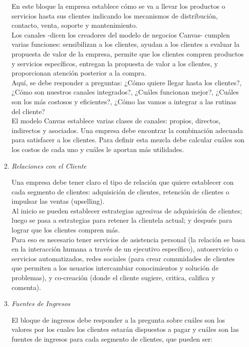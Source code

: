 \documentclass[10pt,a4paper]{article}
\begin{document}
\begin{multicols}{2}
\begin{enumerate}[1.]
			En este bloque la empresa establece cómo se va a llevar los productos o servicios hasta sus clientes indicando los mecanismos de distribución, contacto, venta, soporte y mantenimiento.\\
						
			Los canales -dicen los creadores del modelo de negocios Canvas- cumplen varias funciones: sensibilizan a los clientes, ayudan a los clientes a evaluar la propuesta de valor de la empresa, permite que los clientes compren productos y servicios específicos, entregan la propuesta de valor a los clientes, y proporcionan atención posterior a la compra.\\
			
			Aquí, se debe responder a preguntas: ¿Cómo quiere llegar hasta los clientes?, ¿Cómo son nuestros canales integrados?, ¿Cuáles funcionan mejor?, ¿Cuáles son los más costosos y eficientes?, ¿Cómo las vamos a integrar a las rutinas del cliente?\\
			
			El modelo Canvas establece varias clases de canales: propios, directos, indirectos y asociados. Una empresa debe encontrar la combinación adecuada para satisfacer a los clientes. Para definir esta mezcla debe calcular cuáles son los costos de cada uno y cuáles le aportan más utilidades.
			
			\item \textit{Relaciones con el Cliente}
			
			Una empresa debe tener claro el tipo de relación que quiere establecer con cada segmento de clientes: adquisición de clientes, retención de clientes o impulsar las ventas (upselling).\\
			
			Al inicio se pueden establecer estrategias agresivas de adquisición de clientes; luego se pasa a estrategias para retener la clientela actual; y después para lograr que los clientes compren más.\\
Para eso es necesario tener servicios de asistencia personal (la relación se basa en la interacción humana a través de un ejecutivo específico), autoservicio o servicios automatizados, redes sociales (para crear comunidades de clientes que permiten a los usuarios intercambiar conocimientos y solución de problemas), y co-creación (donde el cliente sugiere, critica, califica y comenta).
			
			\item \textit{Fuentes de Ingresos}
			
			El bloque de ingresos debe responder a la pregunta sobre cuáles son los valores por los cuales los clientes estarán dispuestos a pagar y cuáles son las fuentes de ingresos para cada segmento de clientes, que pueden ser: 
			

\end{enumerate}
\end{multicols}
\end{document}
